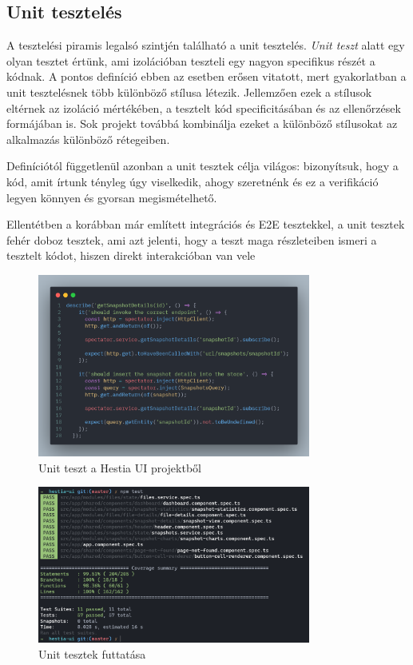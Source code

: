 \subsection{Unit tesztelés}

A tesztelési piramis legalsó szintjén található a unit tesztelés. \textit{Unit teszt} alatt egy olyan tesztet értünk, ami izolációban teszteli egy nagyon specifikus részét a kódnak. A pontos definíció ebben az esetben erősen vitatott, mert gyakorlatban a unit tesztelésnek több különböző stílusa létezik. Jellemzően ezek a stílusok eltérnek az izoláció mértékében, a tesztelt kód specificitásában és az ellenőrzések formájában is. Sok projekt továbbá kombinálja ezeket a különböző stílusokat az alkalmazás különböző rétegeiben.

Definíciótól függetlenül azonban a unit tesztek célja világos: bizonyítsuk, hogy a kód, amit írtunk tényleg úgy viselkedik, ahogy szeretnénk és ez a verifikáció legyen könnyen és gyorsan megismételhető.

Ellentétben a korábban már említett integrációs és E2E tesztekkel, a unit tesztek fehér doboz tesztek, ami azt jelenti, hogy a teszt maga részleteiben ismeri a tesztelt kódot, hiszen direkt interakcióban van vele

\begin{figure}[H]
    \centering
    \includegraphics[width=0.8\textwidth]{images/unit-test.png}
    \caption{Unit teszt a Hestia UI projektből}
    \label{fig:unit-test-example}
\end{figure}

\begin{figure}[H]
    \centering
    \includegraphics[width=0.8\textwidth]{images/testRun.png}
    \caption{Unit tesztek futtatása}
    \label{fig:unit-test-run-example}
\end{figure}

